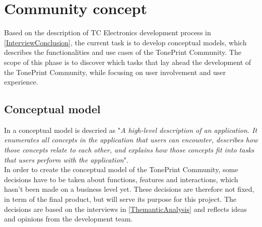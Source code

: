 \chapter{Community concept}
\label{CommunityConcept}
Based on the description of TC Electronics development process in \autoref{InterviewConclusion}, the current task is to develop conceptual models, which describes the functionalities and use cases of the TonePrint Community. The scope of this phase is to discover which tasks that lay ahead the development of the TonePrint Community, while focusing on user involvement and user experience. \\

\section{Conceptual model}
\label{ConceptualModel}
In \parencite[][17]{PDF:Henderson2012} a conceptual model is descried  as "\textit{A high-level description of an application. It enumerates all concepts in the application that users can encounter, describes how those concepts relate to each other, and explains how those concepts fit into tasks that users perform with the application}".\\
In order to create the conceptual model of the TonePrint Community, some decisions have to be taken about functions, features and interactions, which hasn't been made on a business level yet. These decisions are therefore not fixed, in term of the final product, but will serve its purpose for this project. The decisions are based on the interviews in \autoref{ThemanticAnalysis} and reflects ideas and opinions from the development team.

